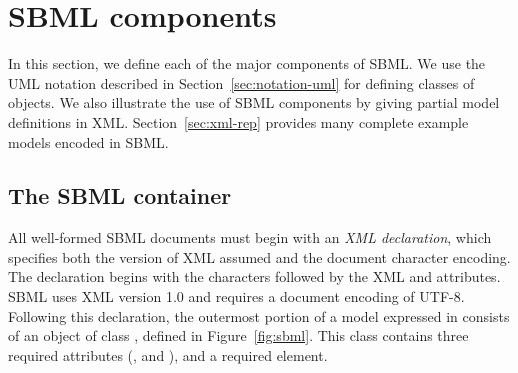 
\section{SBML components}
\label{sec:elements}

In this section, we define each of the major components of SBML.
We use the UML notation described in
Section~\ref{sec:notation-uml} for defining classes of objects.
We also illustrate the use of SBML components by giving partial
model definitions in XML.  Section~\ref{sec:xml-rep} provides many
complete example models encoded in SBML.


\subsection{The SBML container}
\label{sec:sbml}

All well-formed SBML documents must begin with an \emph{XML
  declaration}, which specifies both the version of XML assumed
and the document character encoding.  The declaration begins with
the characters  followed by the XML 
and  attributes.  SBML \thisL uses XML version 1.0
and requires a document encoding of UTF-8.  Following this
declaration, the outermost portion of a model expressed in \thisL
consists of an object of class \Sbml, defined in
Figure~\ref{fig:sbml}.  This class contains three required
attributes (,  and ), and
a required  element.


